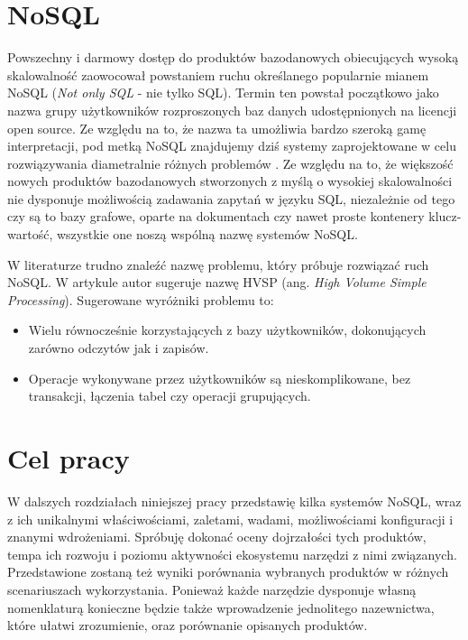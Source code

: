 \section{NoSQL}
Powszechny i darmowy dostęp do produktów bazodanowych obiecujących wysoką skalowalność zaowocował powstaniem ruchu określanego popularnie mianem NoSQL (\emph{Not only SQL} - nie tylko SQL).
Termin ten powstał początkowo jako nazwa grupy użytkowników rozproszonych baz danych udostępnionych na licencji open source.
Ze względu na to, że nazwa ta umożliwia bardzo szeroką gamę interpretacji, pod metką NoSQL znajdujemy dziś systemy zaprojektowane w celu rozwiązywania diametralnie różnych problemów \cite{evans-nosql-what-is-in-a-name}. 
Ze względu na to, że większość nowych produktów bazodanowych stworzonych z myślą o wysokiej skalowalności nie dysponuje możliwością zadawania zapytań w języku SQL, niezależnie od tego czy są to bazy grafowe, oparte na dokumentach czy nawet proste kontenery klucz-wartość, wszystkie one noszą wspólną nazwę systemów NoSQL.

W literaturze trudno znaleźć nazwę problemu, który próbuje rozwiązać ruch NoSQL. 
W artykule \cite{monash-db-hvsp} autor sugeruje nazwę HVSP (ang. \emph{High Volume Simple Processing}). 
Sugerowane wyróżniki problemu to:
\begin{itemize}
 \item Wielu równocześnie korzystających z bazy użytkowników, dokonujących zarówno odczytów jak i zapisów.
 \item Operacje wykonywane przez użytkowników są nieskomplikowane, bez transakcji, łączenia tabel czy operacji grupujących.
\end{itemize}

\section{Cel pracy}

W dalszych rozdziałach niniejszej pracy przedstawię kilka systemów NoSQL, wraz z ich unikalnymi właściwościami, zaletami, wadami, możliwościami konfiguracji i znanymi wdrożeniami.
Spróbuję dokonać oceny dojrzałości tych produktów, tempa ich rozwoju i poziomu aktywności ekosystemu narzędzi z nimi związanych.
Przedstawione zostaną też wyniki porównania wybranych produktów w różnych scenariuszach wykorzystania.
Ponieważ każde narzędzie dysponuje własną nomenklaturą konieczne będzie także wprowadzenie jednolitego nazewnictwa, które ułatwi zrozumienie, oraz porównanie opisanych produktów.
